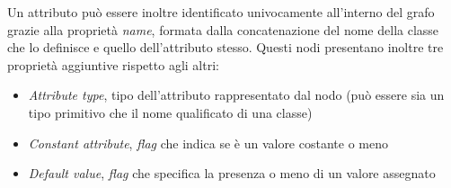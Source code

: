             Un attributo può essere inoltre identificato univocamente all'interno del grafo grazie alla proprietà \textit{name}, formata dalla concatenazione del nome della classe che lo definisce e quello dell'attributo stesso. Questi nodi presentano inoltre tre proprietà aggiuntive rispetto agli altri:
            \begin{itemize}
                \item \textit{Attribute type}, tipo dell'attributo rappresentato dal nodo (può essere sia un tipo primitivo che il nome qualificato di una classe)
                \item \textit{Constant attribute}, \textit{flag} che indica se è un valore costante o meno
                \item \textit{Default value}, \textit{flag} che specifica la presenza o meno di un valore assegnato
            \end{itemize}
            
